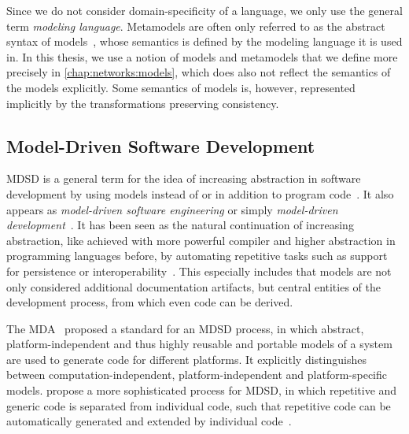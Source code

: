 Since we do not consider domain-specificity of a language, we only use the general term \emph{modeling language}.
Metamodels are often only referred to as the abstract syntax of models~\cite[p.~27]{voelter2013DslEngineering}, whose semantics is defined by the modeling language it is used in.
In this thesis, we use a notion of models and metamodels that we define more precisely in \autoref{chap:networks:models}, which does also not reflect the semantics of the models explicitly.
Some semantics of models is, however, represented implicitly by the transformations preserving consistency.


\subsection{Model-Driven Software Development}
\label{chap:foundations:modeling:mdsd}

\gls{MDSD} is a general term for the idea of increasing abstraction in software development by using models instead of or in addition to program code~\cite{atkinson2003mdd-Software}.
It also appears as \emph{model-driven software engineering} or simply \emph{model-driven development}~\cite{atkinson2003mdd-Software}.
It has been seen as the natural continuation of increasing abstraction, like achieved with more powerful compiler and higher abstraction in programming languages before, by automating repetitive tasks such as support for persistence or interoperability~\cite{atkinson2003mdd-Software}.
This especially includes that models are not only considered additional documentation artifacts, but central entities of the development process, from which even code can be derived.

The \gls{MDA}~\cite{mda} proposed a standard for an \gls{MDSD} process, in which abstract, platform-independent and thus highly reusable and portable models of a system are used to generate code for different platforms.
It explicitly distinguishes between computation-independent, platform-independent and platform-specific models.
\citeauthor{voelter2013mdsd-Book} propose a more sophisticated process for \gls{MDSD}, in which repetitive and generic code is separated from individual code, such that repetitive code can be automatically generated and extended by individual code~\cite[Fig.~2.1]{voelter2013mdsd-Book}.

